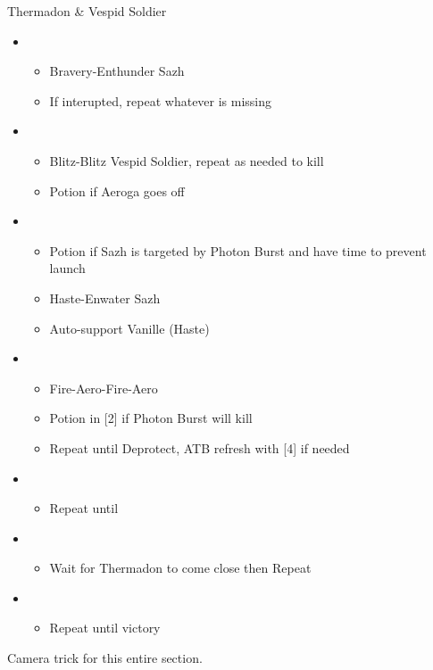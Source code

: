 \begin{multicols}{2}
\begin{battle}{Thermadon \& Vespid Soldier}
\begin{itemize}
    \item \first
    \begin{itemize}
        \item Bravery-Enthunder Sazh
        \item If interupted, repeat whatever is missing
    \end{itemize}
    \item \sixth
    \begin{itemize}
        \item Blitz-Blitz Vespid Soldier, repeat as needed to kill
        \item Potion if Aeroga goes off
    \end{itemize}
    \item \first
    \begin{itemize}
        \item Potion if Sazh is targeted by Photon Burst and have time to prevent launch
        \item Haste-Enwater Sazh
        \item Auto-support Vanille (Haste)
    \end{itemize}
    \item \fifth
    \begin{itemize}
        \item Fire-Aero-Fire-Aero
        \item Potion in [2] if Photon Burst will kill
        \item Repeat until Deprotect, ATB refresh with [4] if needed
    \end{itemize}
    \item \fourth
    \begin{itemize}
        \item Repeat until \stagger
    \end{itemize}
    \item \second
    \begin{itemize}
        \item Wait for Thermadon to come close then Repeat
    \end{itemize}
    \item \third
    \begin{itemize}
        \item Repeat until victory
    \end{itemize}
\end{itemize}
\end{battle}
Camera trick for this entire section.


\end{multicols}
